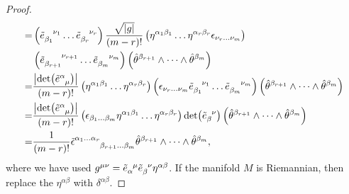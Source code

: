 \documentclass[10pt]{article}
\begin{document}
\begin{proof}
\begin{align}
        = & \left(\tensor{\tilde{e}}{_{\beta_1}^{\nu_1}}\dots\tensor{\tilde{e}}{_{\beta_r}^{\nu_r}}\right)\frac{\sqrt{\abs{g}}}{(m-r)!}\left(\eta^{\alpha_1\beta_1}\dots \eta^{\alpha_r \beta_r}\epsilon_{\nu_r\dots\nu_m}\right)\notag                                                                                                                  \\
          & \left(\tensor{\tilde{e}}{_{\beta_{r+1}}^{\nu_{r+1}}}\dots\tensor{\tilde{e}}{_{\beta_{m}}^{\nu_m}}\right)\left(\hat{\theta}^{\beta_{r+1}}\wedge\dots\wedge\hat{\theta}^{\beta_m}\right)\notag                                                                                                                                                 \\
        = & \frac{\abs{\det(\tensor{\tilde{e}}{^\alpha_\mu})}}{(m-r)!}\left(\eta^{\alpha_1\beta_1}\dots \eta^{\alpha_r \beta_r}\right)\left(\epsilon_{\nu_r\dots\nu_m}\tensor{\tilde{e}}{_{\beta_{1}}^{\nu_{1}}}\dots\tensor{\tilde{e}}{_{\beta_{m}}^{\nu_m}}\right)\left(\hat{\theta}^{\beta_{r+1}}\wedge\dots\wedge\hat{\theta}^{\beta_m}\right)\notag \\
        = & \frac{\abs{\det(\tensor{\tilde{e}}{^\alpha_\mu})}}{(m-r)!}\left(\epsilon_{\beta_1\dots\beta_m}\eta^{\alpha_1\beta_1}\dots \eta^{\alpha_r \beta_r}\right)\det(\tensor{\tilde{e}}{_\beta^\nu})\left(\hat{\theta}^{\beta_{r+1}}\wedge\dots\wedge\hat{\theta}^{\beta_m}\right)\notag                                                             \\
        = & \frac{1}{(m-r)!}\tensor{\tilde{\epsilon}}{^{\alpha_1\dots\alpha_r}_{\beta_{r+1}\dots\beta_m}}\hat{\theta}^{\beta_{r+1}}\wedge\dots\wedge\hat{\theta}^{\beta_m},
    \end{align}
    where we have used $g^{\mu\nu}=\tensor{\tilde{e}}{_\alpha^\mu}\tensor{\tilde{e}}{_\beta^\nu}\eta^{\alpha\beta}$.
    If the manifold $M$ is Riemannian, then replace the $\eta^{\alpha\beta}$ with $\delta^{\alpha\beta}$.
\end{proof}
\end{document}
